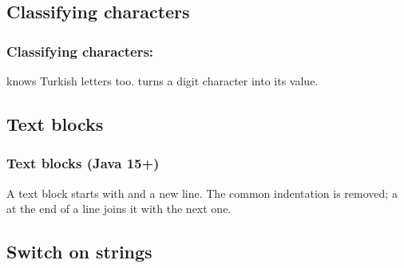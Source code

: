 \documentclass[aspectratio=169,10pt,compress]{beamer}
\begin{document}
\subsection[Chars]{Classifying characters}




\begin{frame}[t,fragile] \frametitle{Classifying characters: }

  \vspace{0.3em}
  \small {} knows Turkish letters too. \hCode{\textquotesingle 7\textquotesingle{} - \textquotesingle 0\textquotesingle} turns a digit character into its value.
\end{frame}


\subsection[Text block]{Text blocks}




\begin{frame}[t,fragile] \frametitle{Text blocks (Java 15+)}

  \vspace{0.3em}
  \small A text block starts with  and a new line. The common indentation is removed;
  a \hCode{\textbackslash} at the end of a line joins it with the next one.
\end{frame}

\subsection[Switch]{Switch on strings}
\end{document}
